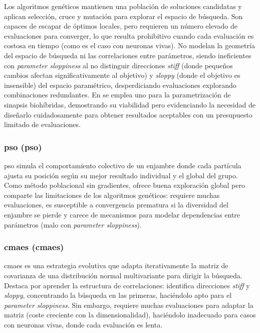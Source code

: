 Los algoritmos genéticos \cite{Holland1975} mantienen una población de soluciones candidatas y aplican selección, cruce y mutación para explorar el espacio de búsqueda. Son capaces de escapar de óptimos locales, pero requieren un número elevado de evaluaciones para converger, lo que resulta prohibitivo cuando cada evaluación es costosa en tiempo (como es el caso con neuronas vivas). No modelan la geometría del espacio de búsqueda ni las correlaciones entre parámetros, siendo ineficientes con \textit{parameter sloppiness} al no distinguir direcciones \textit{stiff} (donde pequeños cambios afectan significativamente al objetivo) y \textit{sloppy} (donde el objetivo es insensible) del espacio paramétrico, desperdiciando evaluaciones explorando combinaciones redundantes. En \cite{ReyesSnchez2023} se emplea uno para la parametrización de sinapsis biohíbridas, demostrando su viabilidad pero evidenciando la necesidad de diseñarlo cuidadosamente para obtener resultados aceptables con un presupuesto limitado de evaluaciones.

\subsubsection{\acl{pso} (\acs{pso})}

\ac{pso} \cite{Kennedy1995} simula el comportamiento colectivo de un enjambre donde cada partícula ajusta su posición según su mejor resultado individual y el global del grupo. Como método poblacional sin gradientes, ofrece buena exploración global pero comparte las limitaciones de los algoritmos genéticos: requiere muchas evaluaciones, es susceptible a convergencia prematura si la diversidad del enjambre se pierde y carece de mecanismos para modelar dependencias entre parámetros (malo con \textit{parameter sloppiness}).

\subsubsection{\acl{cmaes} (\acs{cmaes})}

\ac{cmaes} \cite{Hansen2001} es una estrategia evolutiva que adapta iterativamente la matriz de covarianza de una distribución normal multivariante para dirigir la búsqueda. Destaca por aprender la estructura de correlaciones: identifica direcciones \textit{stiff} y \textit{sloppy}, concentrando la búsqueda en las primeras, haciéndolo apto para el \textit{parameter sloppiness}. Sin embargo, requiere muchas evaluaciones para adaptar la matriz (coste creciente con la dimensionalidad), haciéndolo inadecuado para casos con neuronas vivas, donde cada evaluación es lenta.

